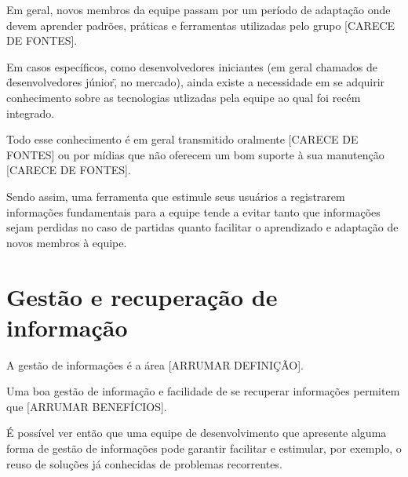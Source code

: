 Em geral, novos membros da equipe passam por um período de adaptação onde devem aprender padrões, práticas e ferramentas utilizadas pelo grupo [CARECE DE FONTES].

Em casos específicos, como desenvolvedores iniciantes (em geral chamados de \"desenvolvedores júnior\", no mercado), ainda existe a necessidade em se adquirir conhecimento sobre as tecnologias utlizadas pela equipe ao qual foi recém integrado.

Todo esse conhecimento é em geral transmitido oralmente [CARECE DE FONTES] ou por mídias que não oferecem um bom suporte à sua manutenção [CARECE DE FONTES].

Sendo assim, uma ferramenta que estimule seus usuários a registrarem informações fundamentais para a equipe tende a evitar tanto que informações sejam perdidas no caso de partidas quanto facilitar o aprendizado e adaptação de novos membros à equipe.

\section{Gestão e recuperação de informação}

A gestão de informações é a área [ARRUMAR DEFINIÇÃO].

Uma boa gestão de informação e facilidade de se recuperar informações permitem que [ARRUMAR BENEFÍCIOS].

É possível ver então que uma equipe de desenvolvimento que apresente alguma forma de gestão de informações pode garantir facilitar e estimular, por exemplo, o reuso de soluções já conhecidas de problemas recorrentes.



